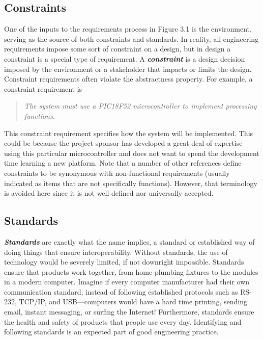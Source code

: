 \subsection{Constraints}
\label{section:constraints}

One of the inputs to the requirements process in Figure 3.1 is the
environment, serving as the source of both constraints and standards. In
reality, all engineering requirements impose some sort of constraint on
a design, but in design a constraint is a special type of requirement. A
\emph{\textbf{constraint}} is a design decision imposed by the
environment or a stakeholder that impacts or limits the design.
Constraint requirements often violate the abstractness property. For
example, a constraint requirement is

\begin{quote}
\emph{The system must use a PIC18F52 microcontroller to implement
processing functions.}
\end{quote}

This constraint requirement specifies how the system will be
implemented. This could be because the project sponsor has developed a
great deal of expertise using this particular microcontroller and does
not want to spend the development time learning a new platform. Note
that a number of other references define constraints to be synonymous
with non-functional requirements (usually indicated as items that are
not specifically functions). However, that terminology is avoided here
since it is not well defined nor universally accepted.

\subsection{Standards}
\label{section:standards}

\emph{\textbf{Standards}} are exactly what the name implies, a standard
or established way of doing things that ensure interoperability. Without
standards, the use of technology would be severely limited, if not
downright impossible. Standards ensure that products work together, from
home plumbing fixtures to the modules in a modern computer. Imagine if
every computer manufacturer had their own communication standard,
instead of following established protocols such as RS-232, TCP/IP, and
USB---computers would have a hard time printing, sending email, instant
messaging, or surfing the Internet! Furthermore, standards ensure the
health and safety of products that people use every day. Identifying and
following standards is an expected part of good engineering practice.

